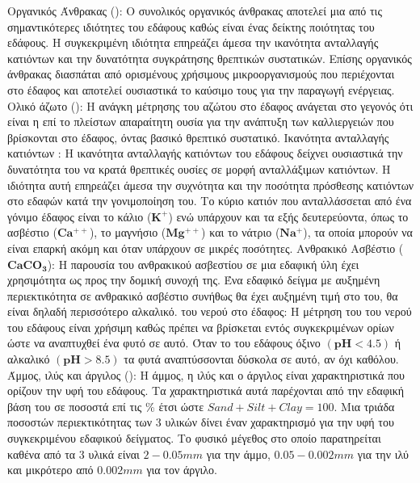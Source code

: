 \begin{outline}
    \1 Οργανικός Άνθρακας (): Ο συνολικός οργανικός άνθρακας αποτελεί μια από τις σημαντικότερες ιδιότητες του εδάφους καθώς είναι ένας δείκτης ποιότητας του εδάφους. Η συγκεκριμένη ιδιότητα επηρεάζει άμεσα την ικανότητα ανταλλαγής κατιόντων και την δυνατότητα συγκράτησης θρεπτικών συστατικών. Επίσης οργανικός άνθρακας διασπάται από ορισμένους χρήσιμους μικροοργανισμούς που περιέχονται στο έδαφος και αποτελεί ουσιαστικά το καύσιμο τους για την παραγωγή ενέργειας.
    \1 Ολικό άζωτο ():  Η ανάγκη μέτρησης του αζώτου στο έδαφος ανάγεται στο γεγονός ότι είναι η επί το πλείστων απαραίτητη ουσία για την ανάπτυξη των καλλιεργειών που βρίσκονται στο έδαφος, όντας βασικό θρεπτικό συστατικό.
    \1 Ικανότητα ανταλλαγής κατιόντων : Η ικανότητα ανταλλαγής κατιόντων του εδάφους δείχνει ουσιαστικά την δυνατότητα του να κρατά θρεπτικές ουσίες σε μορφή ανταλλάξιμων κατιόντων. Η ιδιότητα αυτή επηρεάζει άμεσα την συχνότητα και την ποσότητα πρόσθεσης κατιόντων στο εδαφών κατά την γονιμοποίηση του. Το κύριο κατιόν που ανταλλάσσεται από ένα γόνιμο έδαφος είναι το κάλιο ($\mathbf{K^+}$) ενώ υπάρχουν και τα εξής δευτερεύοντα, όπως το ασβέστιο ($\mathbf{Ca^{++}}$), το μαγνήσιο ($\mathbf{Mg^{++}}$) και το νάτριο ($\mathbf{Na^+}$), τα οποία μπορούν να είναι επαρκή ακόμη και όταν υπάρχουν σε μικρές ποσότητες.
    \1 Ανθρακικό Ασβέστιο ( $\mathbf{CaCO_3}$): Η παρουσία του ανθρακικού ασβεστίου σε μια εδαφική ύλη έχει χρησιμότητα ως προς την δομική συνοχή της. Ένα εδαφικό δείγμα με αυξημένη περιεκτικότητα σε ανθρακικό ασβέστιο συνήθως θα έχει αυξημένη τιμή στο  του, θα είναι δηλαδή περισσότερο αλκαλικό.
    \1  του νερού στο έδαφος: Η μέτρηση του  του νερού του εδάφους είναι χρήσιμη καθώς πρέπει να βρίσκεται εντός συγκεκριμένων ορίων ώστε να αναπτυχθεί ένα φυτό σε αυτό. Όταν το  του εδάφους όξινο $(\mathbf{pH<4.5})$ ή αλκαλικό $(\mathbf{pH>8.5})$ τα φυτά αναπτύσσονται δύσκολα σε αυτό, αν όχι καθόλου.
    \1 Άμμος, ιλύς και άργιλος (): Η άμμος, η ιλύς και ο άργιλος είναι χαρακτηριστικά που ορίζουν την υφή του εδάφους. Τα χαρακτηριστικά αυτά παρέχονται από την εδαφική βάση του  σε ποσοστά επί τις \% έτσι ώστε $Sand+Silt+Clay=100$. Μια τριάδα ποσοστών περιεκτικότητας των 3 υλικών δίνει έναν χαρακτηρισμό για την υφή του συγκεκριμένου εδαφικού δείγματος. Το φυσικό μέγεθος στο οποίο παρατηρείται καθένα από τα 3 υλικά είναι $2-0.05mm$ για την άμμο, $0.05-0.002mm$ για την ιλύ και μικρότερο από $0.002mm$ για τον άργιλο.

\end{outline}
